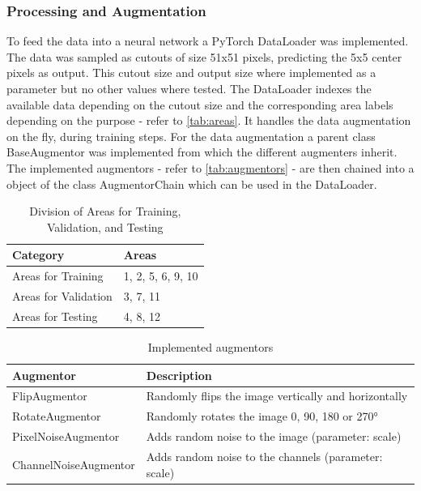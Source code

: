 \subsubsection{Processing and Augmentation}%

To feed the data into a neural network a PyTorch DataLoader was implemented.
The data was sampled as cutouts of size 51x51 pixels, predicting the 5x5 center pixels as output.
This cutout size and output size where implemented as a parameter 
but no other values where tested.
The DataLoader indexes the available data depending on the cutout size and the 
corresponding area labels depending on the purpose - refer to \autoref{tab:areas}. 
It handles the data augmentation on the fly, during training steps.
For the data augmentation a parent class BaseAugmentor was implemented from which the different augmenters inherit. 
The implemented augmentors - refer to \autoref{tab:augmentors} - are then chained into a object of the class AugmentorChain
which can be used in the DataLoader.

\begin{table}[h!]
    \centering
        \begin{tabular}{|l|l|}
        \hline
        \textbf{Category}          & \textbf{Areas}       \\ 
        \hline
        Areas for Training         & 1, 2, 5, 6, 9, 10   \\
        Areas for Validation       & 3, 7, 11            \\
        Areas for Testing          & 4, 8, 12            \\ 
        \hline
        \end{tabular}
    \caption{Division of Areas for Training, Validation, and Testing}
    \label{tab:areas}
\end{table}

\begin{table}[H]
    \centering
        \begin{tabular}{|l|l|}
        \hline
        \textbf{Augmentor} & \textbf{Description} \\
        \hline
        FlipAugmentor & Randomly flips the image vertically and horizontally\\
        RotateAugmentor & Randomly rotates the image 0, 90, 180 or 270° \\
        PixelNoiseAugmentor & Adds random noise to the image (parameter: scale) \\
        ChannelNoiseAugmentor & Adds random noise to the channels (parameter: scale) \\
        \hline
        \end{tabular}
    \caption{Implemented augmentors}
    \label{tab:augmentors}
\end{table}



